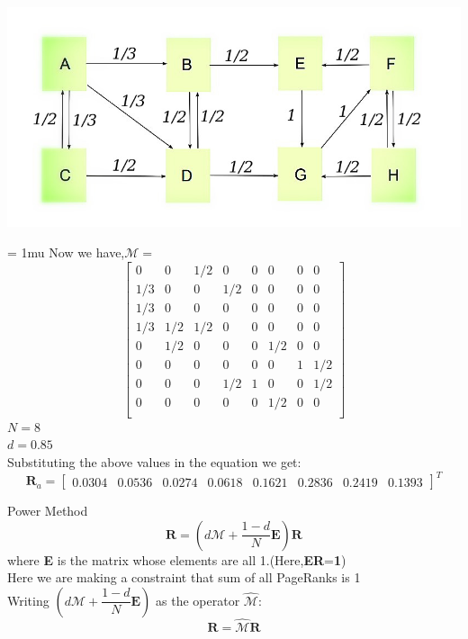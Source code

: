 \documentclass{beamer}
\begin{document}
\begin{frame}
\includegraphics[scale=0.4]{Pagerank.jpg}
\end{frame}
\begin{frame}
\footnotesize
\setlength{\arraycolsep}{6.8pt}
\medmuskip = 1mu
Now we have,$\mathcal{M}=$
\[
\begin{bmatrix}
0 & 0 & 1/2 & 0 & 0 & 0 & 0 & 0\\ 
1/3 & 0 & 0 & 1/2 & 0 & 0 & 0 & 0\\ 
1/3 & 0 & 0 & 0 & 0 & 0 & 0 & 0\\ 
1/3 & 1/2 & 1/2 & 0 & 0 & 0 & 0 & 0\\ 
0 & 1/2 & 0 & 0 & 0 & 1/2 & 0 & 0\\ 
0 & 0 & 0 & 0 & 0 & 0 & 1 & 1/2\\ 
0 & 0 & 0 & 1/2 & 1 & 0 & 0 & 1/2\\ 
0 & 0 & 0 & 0 & 0 & 1/2 & 0 & 0\\ 
\end{bmatrix}
\]
$N= 8$\\
$d=0.85$\\
\vspace{1em}
Substituting the above values in the equation we get:
\[
\textbf{R}_{a}=
\begin{bmatrix}
0.0304 & 0.0536& 0.0274 & 0.0618& 0.1621& 0.2836& 0.2419&0.1393
\end{bmatrix}^T
\]
\end{frame}


\begin{frame}{Power Method}
\[
\textbf{R}=(d\mathcal{M}+\dfrac{1-d}{N}\textbf{E})\textbf{R}
\]
where \textbf{E} is the matrix whose elements are all 1.(Here,\textbf{ER}=\textbf{1})\\
Here we are making a constraint that sum of all PageRanks is 1\\
\vspace{1em}
Writing $(d\mathcal{M}+\dfrac{1-d}{N}\textbf{E})$ as the operator $\widehat{\mathcal{M}}$:
\[
\textbf{R}=\widehat{\mathcal{M}}\textbf{R}
\]
\end{frame}
\end{document}
